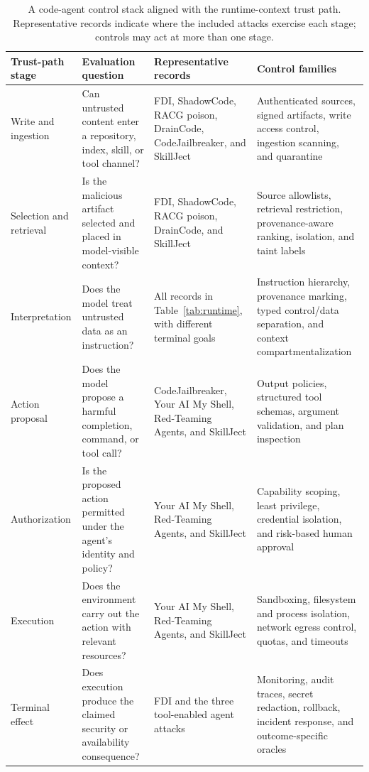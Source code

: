 \documentclass[acmsmall,screen,review]{acmart}
\begin{document}
\begin{table}[t]
\centering
\small
\caption{A code-agent control stack aligned with the runtime-context trust path. Representative records indicate where the included attacks exercise each stage; controls may act at more than one stage.}
\label{tab:agent-control-stack}
\begin{tabularx}{\textwidth}{@{}L{2.15cm}L{3.10cm}L{4.00cm}Y@{}}
\toprule
\textbf{Trust-path stage} & \textbf{Evaluation question} & \textbf{Representative records} & \textbf{Control families} \\
\midrule
Write and ingestion & Can untrusted content enter a repository, index, skill, or tool channel? & FDI, ShadowCode, RACG poison, DrainCode, CodeJailbreaker, and SkillJect & Authenticated sources, signed artifacts, write access control, ingestion scanning, and quarantine \\
Selection and retrieval & Is the malicious artifact selected and placed in model-visible context? & FDI, ShadowCode, RACG poison, DrainCode, and SkillJect & Source allowlists, retrieval restriction, provenance-aware ranking, isolation, and taint labels \\
Interpretation & Does the model treat untrusted data as an instruction? & All records in Table~\ref{tab:runtime}, with different terminal goals & Instruction hierarchy, provenance marking, typed control/data separation, and context compartmentalization \\
Action proposal & Does the model propose a harmful completion, command, or tool call? & CodeJailbreaker, Your AI My Shell, Red-Teaming Agents, and SkillJect & Output policies, structured tool schemas, argument validation, and plan inspection \\
Authorization & Is the proposed action permitted under the agent's identity and policy? & Your AI My Shell, Red-Teaming Agents, and SkillJect & Capability scoping, least privilege, credential isolation, and risk-based human approval \\
Execution & Does the environment carry out the action with relevant resources? & Your AI My Shell, Red-Teaming Agents, and SkillJect & Sandboxing, filesystem and process isolation, network egress control, quotas, and timeouts \\
Terminal effect & Does execution produce the claimed security or availability consequence? & FDI and the three tool-enabled agent attacks & Monitoring, audit traces, secret redaction, rollback, incident response, and outcome-specific oracles \\
\bottomrule
\end{tabularx}
\end{table}
\end{document}
